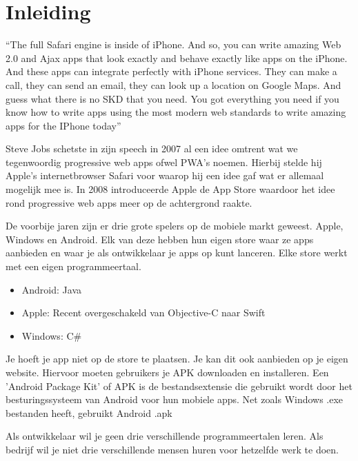 

\chapter{Inleiding}
\label{ch:inleiding}

\nocite{*}

“The full Safari engine is inside of iPhone. And so, you can write amazing Web 2.0 and Ajax apps that look exactly and behave exactly like apps on the iPhone. And these apps can integrate perfectly with iPhone services. They can make a call, they can send an email, they can look up a location on Google Maps. And guess what there is no SKD that you need. You got everything you need if you know how to write apps using the most modern web standards to write amazing apps for the IPhone today” ~\autocite{keynote2007}

Steve Jobs schetste in zijn speech in 2007 al een idee omtrent wat we tegenwoordig progressive web apps ofwel PWA's noemen. Hierbij stelde hij Apple's internetbrowser Safari voor waarop hij een idee gaf wat er allemaal mogelijk mee is. In 2008 introduceerde Apple de App Store waardoor het idee rond progressive web apps meer op de achtergrond raakte.

De voorbije jaren zijn er drie grote spelers op de mobiele markt geweest. Apple, Windows en Android. Elk van deze hebben hun eigen store waar ze apps aanbieden en waar je als ontwikkelaar je apps op kunt lanceren. Elke store werkt met een eigen programmeertaal.
\begin{itemize}  
	\item Android: Java
	\item Apple: Recent overgeschakeld van Objective-C naar Swift
	\item Windows: C\#
\end{itemize}

Je hoeft je app niet op de store te plaatsen. Je kan dit ook aanbieden op je eigen website. Hiervoor moeten gebruikers je APK downloaden en installeren. Een 'Android Package Kit' of APK is de bestandsextensie die gebruikt wordt door het besturingssysteem van Android voor hun mobiele apps. Net zoals Windows .exe bestanden heeft, gebruikt Android .apk ~\autocite{apk}

Als ontwikkelaar wil je geen drie verschillende programmeertalen leren. Als bedrijf wil je niet drie verschillende mensen huren voor hetzelfde werk te doen.

